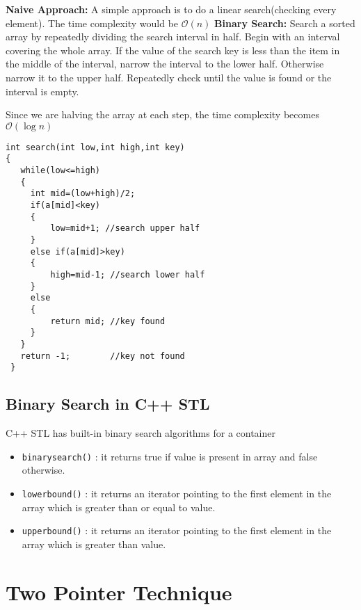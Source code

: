\documentclass[twoside,12pt,a4paper,english]{book}
\theoremstyle{definition}
\theoremstyle{problemstyle}
\theoremstyle{problemstyle}
\theoremstyle{problemstyle}
\begin{document}
\begin{tcolorbox}[breakable, title=Solution]
\textbf{Naive Approach:} A simple approach is to do a linear search(checking every element). The time complexity would be $\mathcal{O}(n)$
\tcblower
\textbf{Binary Search:} Search a sorted array by repeatedly dividing the search interval in half. Begin with an interval covering the whole array. If the value of the search key is less than the item in the middle of the interval, narrow the interval to the lower half. Otherwise narrow it to the upper half. Repeatedly check until the value is found or the interval is empty.

Since we are halving the array at each step, the time complexity becomes $\mathcal{O}(\log{n})$



\begin{lstlisting}
int search(int low,int high,int key)
{
   while(low<=high)
   {
     int mid=(low+high)/2;
     if(a[mid]<key)
     {
         low=mid+1; //search upper half
     }
     else if(a[mid]>key)
     {
         high=mid-1; //search lower half
     }
     else
     {
         return mid; //key found
     }
   }
   return -1;        //key not found
 }
\end{lstlisting}
\end{tcolorbox}
\newpage
\subsection{Binary Search in C++ STL}

C++ STL has built-in binary search algorithms for a container

\begin{itemize}
    \item \texttt{binary\textunderscore search()} : it returns true if value is present in array and false otherwise.
    \item \texttt{lower\textunderscore bound()} : it returns an iterator pointing to the first element in the array which is greater than or equal to value.
    \item \texttt{upper\textunderscore bound()} : it returns an iterator pointing to the first element in the array which is greater than value.
\end{itemize}

\section{Two Pointer Technique}
\end{document}
